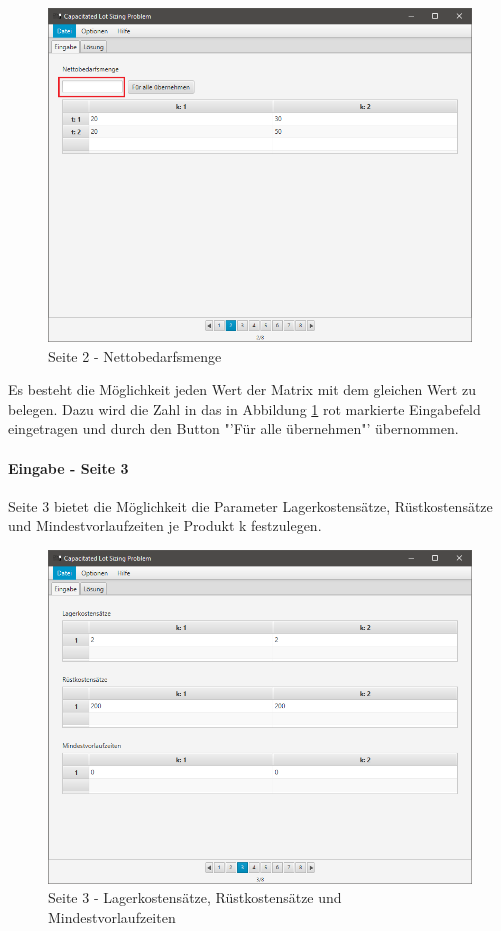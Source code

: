\documentclass[12pt,a4paper, listof=entryprefix, bibliography=totocnumbered,toc=listofnumbered,lof=listofnumbered]{scrartcl}
\begin{document}
\begin{figure}[H]
	\centering
	\includegraphics[width=.8\linewidth]{images/seite2.png} 
	\caption{Seite 2 - Nettobedarfsmenge}
	\label{fig:seite2}
\end{figure}

Es besteht die Möglichkeit jeden Wert der Matrix mit dem gleichen Wert zu belegen. Dazu wird die Zahl in das in Abbildung \ref{fig:seite2} rot markierte Eingabefeld eingetragen und durch den Button "'Für alle übernehmen"' übernommen.

\paragraph{Eingabe - Seite 3}
Seite 3 bietet die Möglichkeit die Parameter Lagerkostensätze, Rüstkostensätze und Mindestvorlaufzeiten je Produkt k festzulegen.

\begin{figure}[H]
	\centering
	\includegraphics[width=.8\linewidth]{images/seite3.png} 
	\caption{Seite 3 - Lagerkostensätze, Rüstkostensätze und Mindestvorlaufzeiten}
	\label{fig:seite3}
\end{figure}
\end{document}
